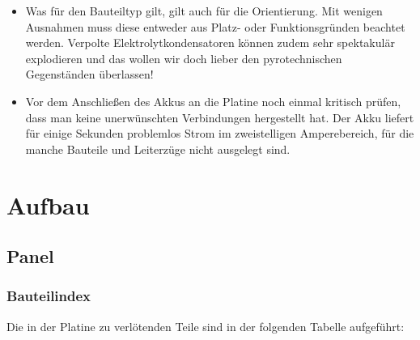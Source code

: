 \documentclass[paper=a4, open=any, numbers=noenddot]{scrbook}
\begin{document}
\begin{itemize}
				\item Was für den Bauteiltyp gilt, gilt auch für die Orientierung. Mit wenigen Ausnahmen muss diese entweder aus Platz- oder Funktionsgründen beachtet werden. Verpolte Elektrolytkondensatoren können zudem sehr spektakulär explodieren und das wollen wir doch lieber den pyrotechnischen Gegenständen überlassen!
				\item Vor dem Anschließen des Akkus an die Platine noch einmal kritisch prüfen, dass man keine unerwünschten Verbindungen hergestellt hat. Der Akku liefert für einige Sekunden problemlos Strom im zweistelligen Amperebereich, für die manche Bauteile und Leiterzüge nicht ausgelegt sind.
			\end{itemize}

	\chapter{Aufbau}

		\section{Panel}

			\subsection*{Bauteilindex}

				Die in der Platine zu verlötenden Teile sind in der folgenden Tabelle aufgeführt:
\end{document}

